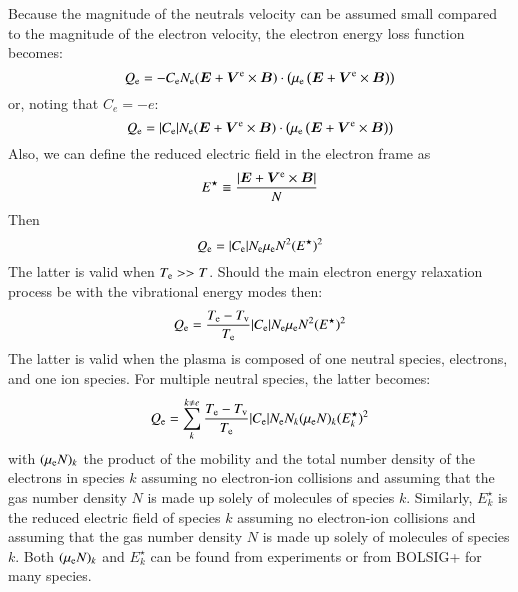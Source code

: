 \documentclass{warpdoc}
\renewcommand{\vec}[1]{\bm{#1}}
\begin{document}
Because the magnitude of the neutrals velocity can be assumed small compared to the magnitude of the electron velocity, the electron energy loss function becomes:
%
\begin{equation}
Q_{\rm e}
= 
  - C_{\rm e} N_{\rm e} (\vec{E}+\vec{V}^{\rm e}\times\vec{B}) \cdot \left( \mu_{\rm e} \left(\vec{E}+\vec{V}^{\rm e} \times \vec{B}\right) \right)
\end{equation}
%
or, noting that $C_e = -e$:
%
\begin{equation}
Q_{\rm e}
= 
  |C_{\rm e}| N_{\rm e} (\vec{E}+\vec{V}^{\rm e}\times\vec{B}) \cdot \left( \mu_{\rm e} \left(\vec{E}+\vec{V}^{\rm e} \times \vec{B}\right) \right)
\end{equation}
%
Also, we can define the reduced electric field in the electron frame as 
%
\begin{equation}
E^\star\equiv \frac{|\vec{E}+\vec{V}^{\rm e}\times \vec{B}|}{N}
\end{equation}
%
Then
%
\begin{equation}
Q_{\rm e}
= 
  |C_{\rm e}| N_{\rm e}\mu_{\rm e}  N^2 (E^\star)^2
\end{equation}
%
The latter is valid when $T_{\rm e} >> T$. Should the main electron energy relaxation process be with the vibrational energy modes then:
%
\begin{equation}
Q_{\rm e}
= 
  \frac{T_{\rm e}-T_{\rm v}}{T_{\rm e}} |C_{\rm e}| N_{\rm e}\mu_{\rm e}  N^2 (E^\star)^2
\end{equation}
%
The latter is valid when the plasma is composed of one neutral species, electrons, and one ion species. For multiple neutral species, the latter becomes:
%
\begin{equation}
Q_{\rm e}
= 
  \sum_k^{k\neq e} \frac{T_{\rm e}-T_{\rm v}}{T_{\rm e}} |C_{\rm e}| N_{\rm e} N_k (\mu_{\rm e}  N)_k  (E^\star_k)^2
\end{equation}
%
with $(\mu_{\rm e} N)_k$ the product of the mobility and the total number density of the electrons in species $k$ assuming no electron-ion collisions and assuming that the gas number density $N$ is made up solely of molecules of species $k$.  Similarly, $E^\star_k$ is the reduced electric field of species $k$ assuming no electron-ion collisions and assuming that the gas number density $N$ is made up solely of molecules of species $k$. Both $(\mu_{\rm e} N)_k$ and $E^\star_k$ can be found from experiments or from BOLSIG+ for many species.
\end{document}
